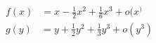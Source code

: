 \begin{align*}
  f(x) &= x -\frac{1}{2}x^2 +\frac{1}{6}x^3 +o(x^)\\
  g(y) &= y + \frac{1}{2}y^2 + \frac{1}{3}y^3 + o(y^3)
\end{align*}
